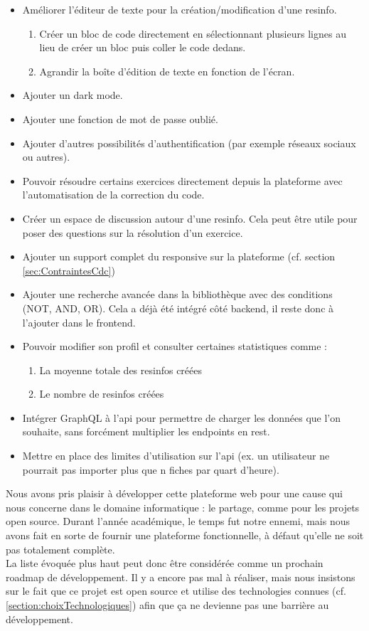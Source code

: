 \begin{itemize}
    \item Améliorer l'éditeur de texte pour la création/modification d'une \gls{resinfo}.
    \begin{enumerate}
        \item Créer un bloc de code directement en sélectionnant plusieurs lignes au lieu de créer un bloc puis coller le code dedans.
        \item Agrandir la boîte d'édition de texte en fonction de l'écran.
    \end{enumerate}
    \item Ajouter un dark mode.
    \item Ajouter une fonction de mot de passe oublié.
    \item Ajouter d'autres possibilités d'authentification (par exemple réseaux sociaux ou autres).
    \item Pouvoir résoudre certains exercices directement depuis la plateforme avec l'automatisation de la correction du code.
    \item Créer un espace de discussion autour d'une \gls{resinfo}. Cela peut être utile pour poser des questions sur la résolution d'un exercice.
    \item Ajouter un support complet du responsive sur la plateforme (cf. section \ref{sec:ContraintesCdc})
    \item Ajouter une recherche avancée dans la bibliothèque avec des conditions (NOT, AND, OR). Cela a déjà été intégré côté \gls{backend}, il reste donc à l'ajouter dans le \gls{frontend}.
    \item Pouvoir modifier son profil et consulter certaines statistiques comme :
    \begin{enumerate}
        \item La moyenne totale des \glspl{resinfo} créées
        \item Le nombre de \glspl{resinfo} créées
    \end{enumerate}
    \item Intégrer GraphQL à l'\gls{api} pour permettre de charger les données que l'on souhaite, sans forcément multiplier les endpoints en \Gls{rest}.
    \item Mettre en place des limites d'utilisation sur l'\gls{api} (ex. un utilisateur ne pourrait pas importer plus que n \glspl{fiche} par quart d'heure).
\end{itemize}

Nous avons pris plaisir à développer cette plateforme web pour une cause qui nous concerne dans le domaine informatique : le partage, comme pour les projets open source. Durant l'année académique, le temps fut notre ennemi, mais nous avons fait en sorte de fournir une plateforme fonctionnelle, à défaut qu'elle ne soit pas totalement complète.\\

La liste évoquée plus haut peut donc être considérée comme un prochain roadmap de développement. Il y a encore pas mal à réaliser, mais nous insistons sur le fait que ce projet est open source et utilise des technologies connues (cf. \ref{section:choixTechnologiques}) afin que ça ne devienne pas une barrière au développement.